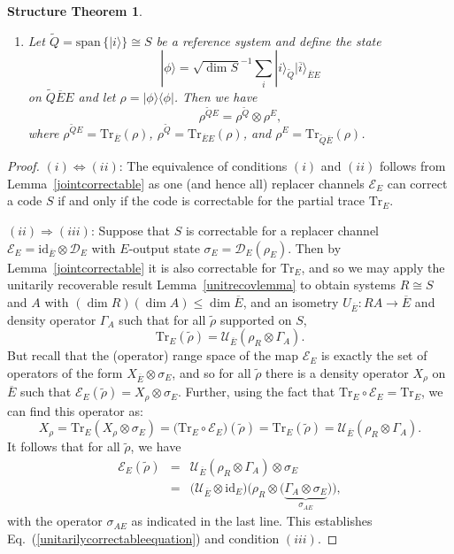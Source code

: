 \documentclass[11pt]{amsart}
\newtheorem*{structurethm}{Structure Theorem}
\theoremstyle{definition}
\theoremstyle{definition}
\theoremstyle{definition}
\newcommand{\tr}{\textrm{Tr}}
\newcommand{\1}{\mathbb{I}}
\newcommand{\T}[1]{\widetilde{#1}} %
\def\ket#1{| #1 \rangle}
\def\kb#1#2{|#1\rangle\!\langle #2 |}
\begin{document}
\begin{structurethm}
\begin{enumerate}
\item[$(v)$]
Let $\T{Q} = \mathrm{span}\, \{ \ket{i} \} \cong S$ be a reference system and define the state 
\[
\ket{\phi} = \sqrt{\dim S}^{-1} \sum_i \ket{i}_{\T{Q}} \ket{\overline{i}}_{\overline{E}E}
\]
on $\T{Q} \overline{E}E$ and let $\rho = \kb{\phi}{\phi}$. Then we have 
\begin{equation}\label{separableequation}
    \rho^{\T{Q}E} = \rho^{\T{Q}} \otimes \rho^E, 
\end{equation}
where $\rho^{\T{Q}E} = \tr_{\overline{E}}(\rho)$, $\rho^{\T{Q}} = \tr_{\overline{E}E}(\rho)$, and $\rho^{E} = \tr_{\T{Q}\overline{E}}(\rho)$.
\end{enumerate}
\end{structurethm}


\begin{proof} 
$(i) \Leftrightarrow (ii)$: The equivalence of conditions $(i)$ and $(ii)$ follows from Lemma~\ref{jointcorrectable} as one (and hence all) replacer channels $\mathcal E_E$ can correct a code $S$ if and only if the code is correctable for the partial trace $\tr_E$. 

$(ii)\Rightarrow (iii)$: Suppose that $S$ is correctable for a replacer channel $\mathcal E_E = \mathrm{id}_{\overline{E}} \otimes \mathcal D_E$ with $E$-output state $\sigma_E = \mathcal D_E(\rho_E)$. Then by Lemma~\ref{jointcorrectable} it is also correctable for $\tr_E$, and so we may apply the unitarily recoverable result Lemma~\ref{unitrecovlemma} to obtain systems $R \cong S$ and $A$ with $(\dim R)(\dim A) \leq \dim \overline{E}$, and an isometry $U_{\overline{E}}: RA \rightarrow \overline{E}$ and density operator $\Gamma_{A}$ such that for all $\widetilde{\rho}$ supported on $S$, 
\[
\tr_E ( \widetilde{\rho} ) = \mathcal U_{\overline{E}} ( \rho_R \otimes \Gamma_{A} ). 
\]
But recall that the (operator) range space of the map $\mathcal E_E$ is exactly the set of operators of the form $X_{\overline{E}} \otimes \sigma_E$, and so for all $\widetilde{\rho}$ there is a density operator $X_\rho$ on $\overline{E}$ such that $\mathcal E_E( \widetilde{\rho}) =  X_\rho \otimes \sigma_E$. Further, using the fact that $\tr_E \circ \mathcal E_E = \tr_E$, we can find this operator as:
\[
X_\rho = \tr_E (X_\rho \otimes \sigma_E ) = \big( \tr_E \circ \mathcal E_E \big) ( \widetilde{\rho} ) = \tr_E ( \widetilde{\rho} ) = \mathcal U_{\overline{E}} ( \rho_R \otimes \Gamma_{A} ).
\]
It follows that for all $\widetilde{\rho}$, we have 
\begin{eqnarray*}
    \mathcal E_E ( \widetilde{\rho} ) &=& \mathcal U_{\overline{E}} ( \rho_R \otimes \Gamma_{A} ) \otimes \sigma_E  \\ 
    &=& \Big( \mathcal U_{\overline{E}} \otimes \mathrm{id}_E \Big) \Big( \rho_R \otimes \big(  \underbrace{\Gamma_{A}  \otimes \sigma_E}_{\sigma_{A E}} \big) \Big) ,  
\end{eqnarray*}
with the operator $\sigma_{A E}$ as indicated in the last line. This establishes Eq.~(\ref{unitarilycorrectableequation}) and condition $(iii)$. 




\end{proof}
\end{document}
